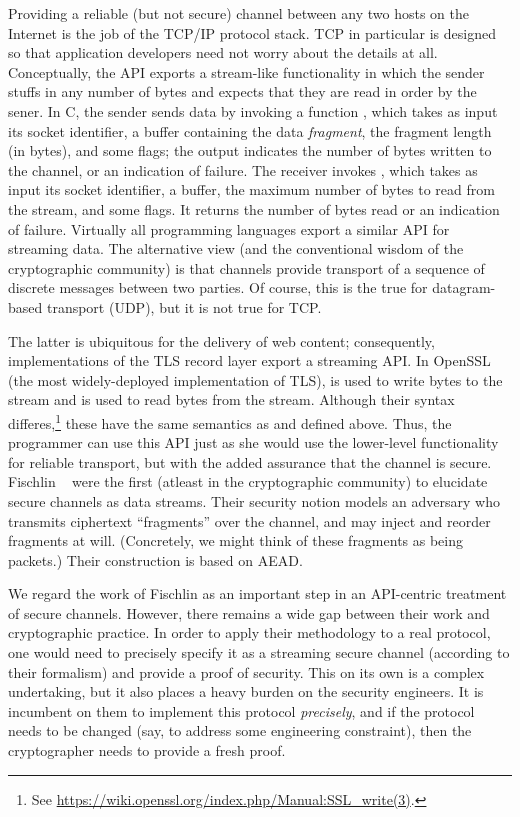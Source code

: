 Providing a reliable (but not secure) channel between any two hosts on the Internet
is the job of the TCP/IP protocol stack. TCP in particular is designed so that
application developers need not worry about the details at all.
%
Conceptually, the API exports a stream-like functionality in which the sender
stuffs in any number of bytes and expects that they are read in order by the
sener.
%
In C, the sender sends data by invoking a function , which
takes as input its socket identifier, a buffer containing the data
\emph{fragment}, the fragment length (in bytes), and some flags; the output
indicates the number of bytes written to the channel, or an indication of
failure. The receiver invokes , which takes as input its socket
identifier, a buffer, the maximum number of bytes to read from the stream, and
some flags. It returns the number of bytes read or an indication of failure.
%
Virtually all programming languages export a similar API for streaming data. The
alternative view (and the conventional wisdom of the cryptographic community) is
that channels provide transport of a sequence of discrete messages between two
parties. Of course, this is the true for datagram-based transport (UDP), but it
is not true for TCP.

The latter is ubiquitous for the delivery of web content; consequently,
implementations of the TLS record layer export a streaming API. In OpenSSL (the
most widely-deployed implementation of TLS),  is used to
write bytes to the stream and  is used to read bytes from
the stream. Although their syntax differes,\footnote{ See
\url{https://wiki.openssl.org/index.php/Manual:SSL_write(3)}.} these have the
same semantics as  and  defined above. Thus,
the programmer can use this API just as she would use the lower-level
functionality for reliable transport, but with the added assurance that the
channel is secure.
%
Fischlin \etal~\cite{FPMG15} were the first (atleast in the cryptographic
community) to elucidate secure channels as data streams.
%
Their security notion models an adversary who transmits ciphertext ``fragments''
over the channel, and may inject and reorder fragments at will. (Concretely, we
might think of these fragments as being packets.) Their construction is based on
AEAD.

We regard the work of Fischlin \etal as an important step in an API-centric
treatment of secure channels.
%
However, there remains a wide gap between their work and cryptographic practice.
In order to apply their methodology to a real protocol, one would need to
precisely specify it as a streaming secure channel (according to their
formalism) and provide a proof of security. This on its own is a complex
undertaking, but it also places a heavy burden on the security engineers. It is
incumbent on them to implement this protocol \emph{precisely}, and if the
protocol needs to be changed (say, to address some engineering constraint), then
the cryptographer needs to provide a fresh proof.

